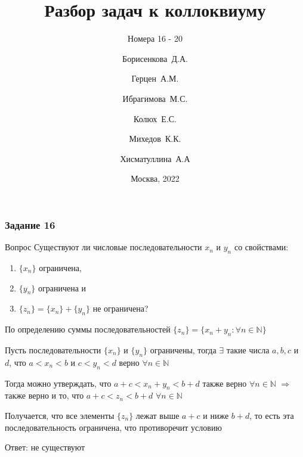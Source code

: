 \documentclass[8pt]{beamer}
\title[Коллоквиум]
{Разбор задач к коллоквиуму}
\subtitle{Номера 16 - 20}
\author[БИБ224]
{Борисенкова~Д.А. \and Герцен~А.М. \and Ибрагимова~М.С. \and Колюх~Е.С. \and Михедов~К.К. \and Хисматуллина~А.А}
\institute[НИУ ВШЭ]
{НИУ Высшая Школа Экономики}
\date{Москва, 2022}
\begin{document}
    
  \frame{\titlepage}

  \begin{frame}
    \frametitle{Задание 16}    

    \begin{block}{Вопрос}
        Существуют ли числовые последовательности $x_n$ и $y_n$ со свойствами:
        \begin{enumerate}
            \item $\{x_n\}$ ограничена,
            \item $\{y_n\}$ ограничена и
            \item $\{z_n\} = \{x_n\} + \{y_n\}$ не ограничена?
        \end{enumerate}
    \end{block} \pause

    По определению суммы последовательностей $\{z_n\} = \{x_n + y_n: \forall n \in \mathbb{N}\}$ \pause

    Пусть последовательности $\{x_n\}$ и $\{y_n\}$ ограничены, тогда $\exists$ такие числа $a, b, c$ и $d$,
    что $a < x_n < b$ и $c < y_n < d$ верно $\forall n \in \mathbb{N}$ \pause

    Тогда можно утверждать, что $a + c < x_n + y_n < b + d$ также верно $\forall n \in \mathbb{N}$
    $\Rightarrow$ также верно и то, что $a + c < z_n < b + d$ $\forall n \in \mathbb{N}$ \pause

    Получается, что все элементы $\{z_n\}$ лежат выше $a+c$ и ниже $b + d$, то есть эта последовательность
    ограничена, что противоречит условию \pause

    \begin{flushright}
        Ответ: не существуют
    \end{flushright}
  \end{frame}
\end{document}
